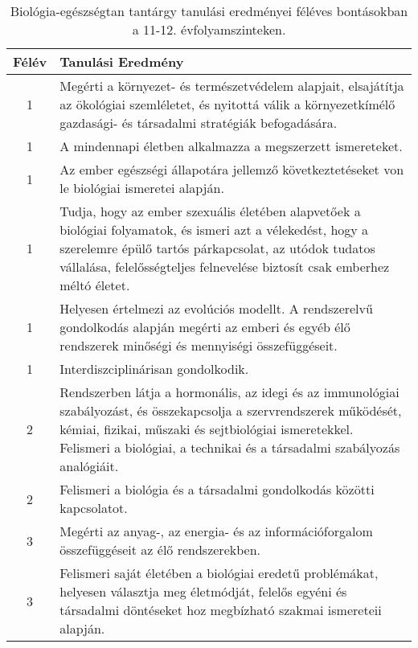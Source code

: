        
           \begin{longtable}{c | p{12cm} }
            \caption[Biológia-egészségtan 11-12.]{Biológia-egészségtan tantárgy tanulási eredményei féléves bontásokban a 11-12. évfolyamszinteken. }  \\

            \textbf{Félév} & \textbf{Tanulási Eredmény} \\
            \hline
            \endhead
                                
                                          1 &  Megérti a környezet- és természetvédelem alapjait, elsajátítja az ökológiai szemléletet, és nyitottá válik a környezetkímélő gazdasági- és társadalmi stratégiák befogadására. \\ \hline
                                          1 &  A mindennapi életben alkalmazza a megszerzett ismereteket. \\ \hline
                                          1 &  Az ember egészségi állapotára jellemző következtetéseket von le biológiai ismeretei alapján. \\ \hline
                                          1 &  Tudja, hogy az ember szexuális életében alapvetőek a biológiai folyamatok, és ismeri azt a vélekedést, hogy a szerelemre épülő tartós párkapcsolat, az utódok tudatos vállalása, felelősségteljes felnevelése biztosít csak emberhez méltó életet. \\ \hline
                                          1 &  Helyesen értelmezi az evolúciós modellt. A rendszerelvű gondolkodás alapján megérti az emberi és egyéb élő rendszerek minőségi és mennyiségi összefüggéseit. \\ \hline
                                          1 &  Interdiszciplinárisan gondolkodik. \\ \hline
                                      
                                
                                          2 &  Rendszerben látja a hormonális, az idegi és az immunológiai szabályozást, és összekapcsolja a szervrendszerek működését, kémiai, fizikai, műszaki és sejtbiológiai ismeretekkel. Felismeri a biológiai, a technikai és a társadalmi szabályozás analógiáit. \\ \hline
                                          2 &  Felismeri a biológia és a társadalmi gondolkodás közötti kapcsolatot. \\ \hline
                                      
                                
                                          3 &  Megérti az anyag-, az energia- és az információforgalom összefüggéseit az élő rendszerekben. \\ \hline
                                          3 &  Felismeri saját életében a biológiai eredetű problémákat, helyesen választja meg életmódját, felelős egyéni és társadalmi döntéseket hoz megbízható szakmai ismereteii alapján. \\ \hline
                                      

\end{longtable}
